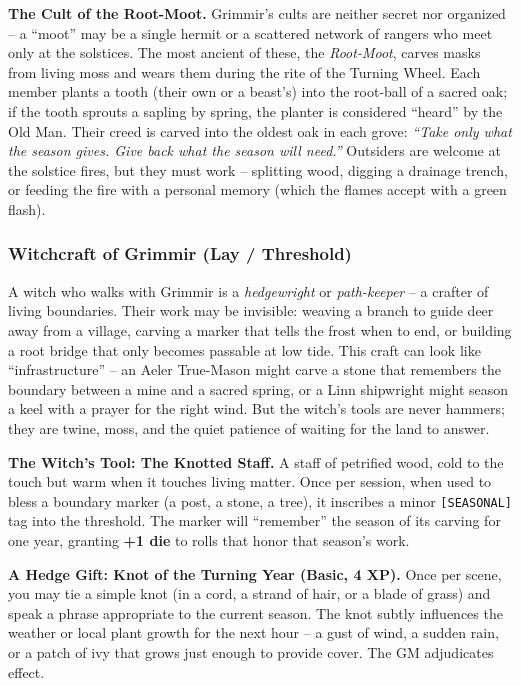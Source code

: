 \textbf{The Cult of the Root-Moot.} Grimmir's cults are neither secret nor organized -- a ``moot'' may be a single hermit or a scattered network of rangers who meet only at the solstices. The most ancient of these, the \textit{Root-Moot}, carves masks from living moss and wears them during the rite of the Turning Wheel. Each member plants a tooth (their own or a beast's) into the root-ball of a sacred oak; if the tooth sprouts a sapling by spring, the planter is considered ``heard'' by the Old Man. Their creed is carved into the oldest oak in each grove: \textit{``Take only what the season gives. Give back what the season will need.''} Outsiders are welcome at the solstice fires, but they must work -- splitting wood, digging a drainage trench, or feeding the fire with a personal memory (which the flames accept with a green flash).

\subsubsection*{Witchcraft of Grimmir (Lay / Threshold)}

A witch who walks with Grimmir is a \textit{hedgewright} or \textit{path-keeper} -- a crafter of living boundaries. Their work may be invisible: weaving a branch to guide deer away from a village, carving a marker that tells the frost when to end, or building a root bridge that only becomes passable at low tide. This craft can look like ``infrastructure'' -- an Aeler True-Mason might carve a stone that remembers the boundary between a mine and a sacred spring, or a Linn shipwright might season a keel with a prayer for the right wind. But the witch's tools are never hammers; they are twine, moss, and the quiet patience of waiting for the land to answer.

\textbf{The Witch's Tool: The Knotted Staff.} A staff of petrified wood, cold to the touch but warm when it touches living matter. Once per session, when used to bless a boundary marker (a post, a stone, a tree), it inscribes a minor \texttt{[SEASONAL]} tag into the threshold. The marker will ``remember'' the season of its carving for one year, granting \textbf{+1 die} to rolls that honor that season's work.

\textbf{A Hedge Gift: Knot of the Turning Year (Basic, 4 XP).} Once per scene, you may tie a simple knot (in a cord, a strand of hair, or a blade of grass) and speak a phrase appropriate to the current season. The knot subtly influences the weather or local plant growth for the next hour -- a gust of wind, a sudden rain, or a patch of ivy that grows just enough to provide cover. The GM adjudicates effect.

